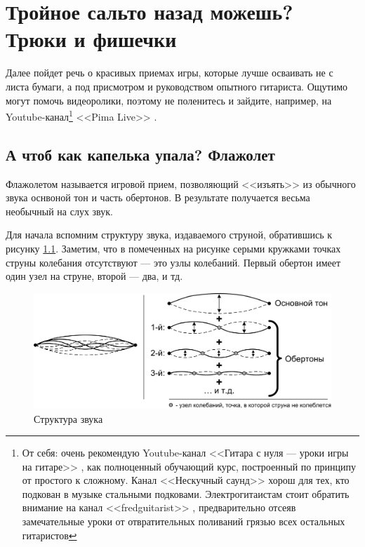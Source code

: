 \chapter{Тройное сальто назад можешь? Трюки и фишечки}
\label{ch:tricks}

Далее пойдет речь о красивых приемах игры, которые лучше осваивать не с листа бумаги, а под присмотром и руководством опытного гитариста. Ощутимо могут помочь видеоролики, поэтому не поленитесь и зайдите, например, на Youtube-канал\footnote{От себя: очень рекомендую Youtube-канал <<Гитара с нуля --- уроки игры на гитаре>> \cite{url:guitarFromZero}, как полноценный обучающий курс, построенный по принципу от простого к сложному. Канал <<Нескучный саунд>> \cite{url:funnySound} хорош для тех, кто подкован в музыке стальными подковами. Электрогитаистам стоит обратить внимание на канал <<fredguitarist>> \cite{url:fredguitarist}, предварительно отсеяв замечательные уроки от отвратительных поливаний грязью всех остальных гитаристов} <<Pima Live>> \cite{url:pimalive}.


\section{А чтоб как капелька упала? Флажолет}
\label{ch:tricks:flageolet}

Флажолетом называется игровой прием, позволяющий <<изъять>> из обычного звука оснвоной тон и часть обертонов. В результате получается весьма необычный на слух звук.

Для начала вспомним структуру звука, издаваемого струной, обратившись к рисунку \ref{fig:tricks:flageolet:nodes}. Заметим, что в помеченных на рисунке серыми кружками точках струны колебания отсутствуют --- это узлы колебаний. Первый обертон имеет один узел на струне, второй --- два, и тд.

\begin{figure}[!ht]
    \centering
    \includegraphics{fig/string-nodes} 
    \caption{Структура звука}\label{fig:tricks:flageolet:nodes}
\end{figure}

